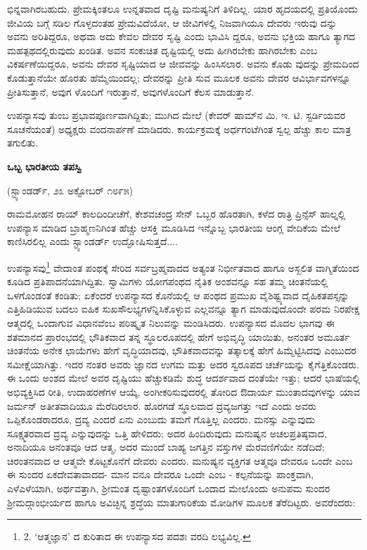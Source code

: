 ಭಿನ್ನವಾಗಿರಬಹುದು. ಪ್ರೇಮಕ್ಕಿಂತಲೂ ಉನ್ನತವಾದ ದೃಷ್ಟಿ ಮನುಷ್ಯನಿಗೆ ತಿಳಿದಿಲ್ಲ. ಯಾರ ಹೃದಯದಲ್ಲಿ ಪ್ರತಿಯೊಂದು ಜೀವಿಯ ಬಗ್ಗೆ ಸಡಿಲ ಗೊಳ್ಳದಂತಹ ಪ್ರೇಮವಿದೆಯೋ, ಆ ಜೀವಿಗಳಲ್ಲಿ ನಿಜವಾಗಿಯೂ ದೇವರು ಇರುವು ದನ್ನು ಅವನು ಅರಿತಿದ್ದರೂ, ಅಥವಾ ಅದು ಕೇವಲ ದೇವರ ಸೃಷ್ಟಿ ಎಂದು ಭಾವಿಸಿ ದ್ದರೂ, ಅವನು ಭಕ್ತಿಯ ಹಾಗೂ ತ್ಯಾಗದ ಮಹತ್ಪಥದಲ್ಲಿರುವುದು ಖಂಡಿತ. ಅವನ ಸಂಕುಚಿತ ದೃಷ್ಟಿಯಲ್ಲಿ ಅದು ಹೀಗಿರಬೇಕು ಹಾಗಿರಬೇಕು ಎಂಬ ವಿಕರ್ಷಣೆಯಿದ್ದರೂ, ಅವನು ದೇವರ ಸೃಷ್ಟಿಯಾದ ಆ ಜೀವವನ್ನು ಹಿಂಸಿಸಲಾರ. ಅವನು ಕೊಡು ವುದನ್ನು ಪ್ರೇಮದಿಂದ ಕೊಡುತ್ತಾನೆಯೇ ಹೊರತು ಹೆಮ್ಮೆಯಿಂದಲ್ಲ; ದೇವರನ್ನು ಪ್ರೀತಿ ಸುವ ಮೂಲಕ ಅವನು ದೇವರ ಆವಿರ್ಭಾವಗಳನ್ನೂ ಪ್ರೀತಿಸುತ್ತಾನೆ, ಅವುಗ ಳೊಂದಿಗೆ ಇರುತ್ತಾನೆ, ಅವುಗಳೊಂದಿಗೆ ಕೆಲಸ ಮಾಡುತ್ತಾನೆ.

ಉಪನ್ಯಾಸವು ತುಂಬ ಪ್ರಭಾವಪೂರ್ಣವಾಗಿದ್ದಿತು; ಮುಗಿದ ಮೇಲೆ (ಕೇವರ್ ಷಾಮ್​ನ ಮಿ. ಇ. ಟಿ. ಸ್ಟರ್ಡಿಯವರ ಸೂಚನೆಯಂತೆ) ಅಧ್ಯಕ್ಷರು ವಂದನಾರ್ಪಣೆ ಮಾಡಿದರು. ಕಾರ್ಯಕ್ರಮಕ್ಕೆ ಅರ್ಧಗಂಟೆಗಿಂತ ಸ್ವಲ್ಪ ಹೆಚ್ಚು ಕಾಲ ಮಾತ್ರ ತಗುಲಿತು.

\begin{center}
\textbf{ಒಬ್ಬ ಭಾರತೀಯ ತಪಸ್ವಿ}
\end{center}

\begin{center}
(ಸ್ಟ್ಯಾಂಡರ್ಡ್, ೨೩ ಅಕ್ಟೋಬರ್ ೧೮೯೫)
\end{center}

ರಾಮಮೋಹನ ರಾಯ್​  ಕಾಲದಿಂದೀಚೆಗೆ, ಕೇಶವಚಂದ್ರ  ಸೇನ್ ಒಬ್ಬರ ಹೊರತಾಗಿ, ಕಳೆದ ರಾತ್ರಿ ಪ್ರಿನ್ಸೆಸ್ ಹಾಲ್ನಲ್ಲಿ ಉಪನ್ಯಾಸ ಮಾಡಿದ ಬ್ರಾಹ್ಮಣನಿಗಿಂತ ಹೆಚ್ಚು ಆಸಕ್ತಿ ಮೂಡಿಸಿದ ಇನ್ನೊಬ್ಬ ಭಾರತೀಯ ಆಂಗ್ಲ ವೇದಿಕೆಯ ಮೇಲೆ ಕಾಣಿಸಿರಲಿಲ್ಲ ಎಂದು ಸ್ಟ್ಯಾಂಡರ್ಡ್ ಉದ್ಘೋಷಿಸುತ್ತದೆ....

ಉಪನ್ಯಾಸವು\footnote{2. ‘ಆತ್ಮಜ್ಞಾನ’ ದ ಕುರಿತಾದ ಈ ಉಪನ್ಯಾಸದ ಪದಶಃ ವರದಿ ಲಭ್ಯವಿಲ್ಲ.} ವೇದಾಂತ ಪಂಥಕ್ಕೆ ಸೇರಿದ ಸರ್ವಬ್ರಹ್ಮವಾದದ ಅತ್ಯಂತ ನಿರ್ಭೀತವಾದ ಹಾಗೂ ಅಸ್ಖಲಿತ ವಾಗ್ಮಿತೆಯಿಂದ ಕೂಡಿದ ಪ್ರತಿಪಾದನೆಯಾಗಿದ್ದಿತು. ಸ್ವಾಮಿಗಳು ಯೋಗಪಂಥದ ನೈತಿಕ ಅಂಶವನ್ನೂ ಸಹ ತಮ್ಮ ಚಿಂತನೆಯಲ್ಲಿ ಒಳಗೊಂಡಂತೆ ಕಂಡಿತು; ಏಕೆಂದರೆ ಉಪನ್ಯಾಸದ ಕೊನೆಯಲ್ಲಿ ಆ ಪಂಥದ ಪ್ರಮುಖ ವೈಶಿಷ್ಟ್ಯವಾದ ದೈಹಿಕತಪಸ್ಸನ್ನು ಎತ್ತಿಹಿಡಿಯುವ ಬದಲು ಐಹಿಕ ಸುಖಸೌಲಭ್ಯಗಳೆನ್ನಿಸಿಕೊಳ್ಳುವ ಎಲ್ಲವನ್ನೂ ತ್ಯಾಗ ಮಾಡುವುದೊಂದೇ ಪರಮ ನಿರಪೇಕ್ಷ ಆತ್ಮದಲ್ಲಿ ಒಂದಾಗುವ ವಿಧಾನವೆಂಬ ಪರಿಷ್ಕೃತ ನಿಲುವನ್ನು ಮಂಡಿಸಿದರು. ಉಪನ್ಯಾಸದ ಮೊದಲ ಭಾಗವು ಈ ಶತಮಾನದ ಪ್ರಾರಂಭದಲ್ಲಿ ಭೌತಿಕವಾದ ತನ್ನ ಸ್ಥೂಲರೂಪದಲ್ಲಿ ಹೇಗೆ ಅಭಿವೃದ್ಧಿ ಯಾಯಿತು, ಅನಂತರ ಅಮೂರ್ತ ಚಿಂತನೆಯ ಅನೇಕ ಛಾಯೆಗಳು ಹೇಗೆ ವೃದ್ಧಿಯಾದವು, ಭೌತಿಕವಾದವನ್ನು ತತ್ಕಾಲಕ್ಕೆ ಹೇಗೆ ಹಿಮ್ಮೆಟ್ಟಿಸಿದವು ಎಂಬುದರ ಸಮೀಕ್ಷೆಯಾಗಿತ್ತು. ಇದರ ನಂತರ ಅವರು ಜ್ಞಾನದ ಉಗಮ ಮತ್ತು ಅದರ ಸ್ವರೂಪದ ಚರ್ಚೆಯನ್ನು ಕೈಗೆತ್ತಿಕೊಂಡರು. ಈ ಒಂದು ಅಂಶದ ಮೇಲೆ ಅವರ ದೃಷ್ಟಿಯು ಹೆಚ್ಚುಕಡಿಮೆ ಶುದ್ಧ ಆದರ್ಶವಾದ  ದಂತೆಯೇ ಇತ್ತು; ಆದರೆ ಭಾಷೆಯಲ್ಲಿ ಅಭಿವ್ಯಕ್ತಿಸಿದ ರೀತಿ, ಉದಾಹರಣೆಗಳ ಆಯ್ಕೆ, ಅಂಗೀಕರಿಸುವುದರಲ್ಲಿ ತೋರಿದ ಔದಾರ್ಯ ಮುಂತಾದವುಗಳನ್ನು ಯಾವ ಜರ್ಮನ್ ಅತೀತವಾದಿಯೂ ಮೆರೆದಿರಲಾರ. ಹೊರಗಡೆ ಸ್ಥೂಲವಾದ ದ್ರವ್ಯಜಗತ್ತು ಇದೆ ಎಂದು ಅವರು ಒಪ್ಪಿಕೊಂಡರಾದರೂ, ದ್ರವ್ಯ ಎಂದರೆ ಏನು ಎಂಬುದು ತಮಗೆ ಗೊತ್ತಿಲ್ಲ ಎಂದರು. ಮನಸ್ಸು ಎನ್ನುವುದು ಸೂಕ್ಷ್ಮತರವಾದ ದ್ರವ್ಯ ಎನ್ನುವುದನ್ನು ಒತ್ತಿ ಹೇಳಿದರು; ಅದರ ಹಿಂದಿರುವುದು ಮನುಷ್ಯನ ಅಚಲಪ್ರತಿಷ್ಠವಾದ, ಅನಾದಿಯೂ ಅನಂತವೂ ಆದ ಆತ್ಮ, ಅದರ ಮುಂದೆ ಬಾಹ್ಯ ಜಗತ್ತಿನ ವಸ್ತುಗಳ ಮೆರವಣಿಗೆಯೇ ನಡೆದಿದೆ; ಚಿರಂತನವಾದ ಆ ಆತ್ಮವೇ ಕೊಟ್ಟಕೊನೆಗೆ ದೇವರು ಎಂದರು. ಮನುಷ್ಯನ ವ್ಯಕ್ತಿಗತ ಆತ್ಮವೂ ದೇವರೂ ಒಂದೇ ಎಂಬ ಈ ಸುಂದರ ಏಕದೇವತಾವಾದದ- ಮಾನ ವನೂ ದೇವರೂ ಒಂದೇ ಎಂಬ - ಕಲ್ಪನೆಯನ್ನು ಪಾಂಕ್ತವಾಗಿ, ಎಳೆಎಳೆಯಾಗಿ, ಅರ್ಥವತ್ತಾಗಿ, ಶ‍್ರೀಮಂತ ದೃಷ್ಟಾಂತಗಳೊಂದಿಗೆ ಒಂದಾದ ಮೇಲೊಂದು ಅನುಪಮ ಸುಂದರ ಶ‍್ರೀಮದ್ಗಾಂಭೀರ್ಯದ ಹಾಗೂ ಅವಿಚ್ಛಿನ್ನ ಶ್ರದ್ಧೆಯ ಮಾತುಗಾರಿಕೆಯ ಮೋಡಿಗಳ ಮೂಲಕ ತೆರೆದಿಟ್ಟರು. ಅವರೆಂದರು:

